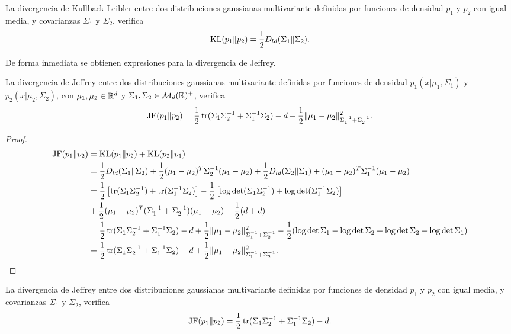 \begin{cor} \label{prop:caract_kl:2}
    La divergencia de Kullback-Leibler entre dos distribuciones gaussianas multivariante definidas por funciones de densidad $p_1$ y $p_2$ con igual media, y covarianzas $\Sigma_1$ y $\Sigma_2$, verifica
    \[  \operatorname{KL}(p_1\|p_2) = \frac{1}{2}D_{ld}(\Sigma_1\|\Sigma_2). \]
\end{cor}
De forma inmediata se obtienen expresiones para la divergencia de Jeffrey.
\begin{cor} \label{prop:caract_jeffrey:1}
    La divergencia de Jeffrey entre dos distribuciones gaussianas multivariante definidas por funciones de densidad $p_1(x|\mu_1,\Sigma_1)$ y $p_2(x|\mu_2,\Sigma_2)$, con $\mu_1,\mu_2 \in \mathbb{R}^d$ y $\Sigma_1,\Sigma_2 \in \mathcal{M}_d(\mathbb{R})^+$, verifica
    \[  \operatorname{JF}(p_1\|p_2) = \frac{1}{2}\operatorname{tr}(\Sigma_1\Sigma_2^{-1}+\Sigma_1^{-1}\Sigma_2) -d + \frac{1}{2}\|\mu_1-\mu_2\|_{\Sigma_1^{-1}+\Sigma_2^{-1}}^2. \]
\end{cor}
\begin{proof}
    \begin{equation*}
        \begin{split}
        \operatorname{JF}(p_1\|p_2) &= \operatorname{KL}(p_1\|p_2) + \operatorname{KL}(p_2\|p_1) \\
                    &= \frac{1}{2}D_{ld}(\Sigma_1\|\Sigma_2) + \frac{1}{2}(\mu_1-\mu_2)^T\Sigma_2^{-1}(\mu_1-\mu_2) + \frac{1}{2}D_{ld}(\Sigma_2\|\Sigma_1) + (\mu_1-\mu_2)^T\Sigma_1^{-1}(\mu_1-\mu_2) \\
                    &= \frac{1}{2}\left[\operatorname{tr}(\Sigma_1\Sigma_2^{-1})+\operatorname{tr}(\Sigma_1^{-1}\Sigma_2)\right] - \frac{1}{2}\left[\log\det(\Sigma_1\Sigma_2^{-1})+\log\det(\Sigma_1^{-1}\Sigma_2)\right]\\&+\frac{1}{2}(\mu_1-\mu_2)^T(\Sigma_1^{-1}+\Sigma_2^{-1})(\mu_1-\mu_2) - \frac{1}{2}(d+d) \\
                    &= \frac{1}{2} \operatorname{tr}(\Sigma_1\Sigma_2^{-1}+\Sigma_1^{-1}\Sigma_2) -d + \frac{1}{2}\|\mu_1-\mu_2\|_{\Sigma_1^{-1}+\Sigma_2^{-1}}^2 - \frac{1}{2}(\log\det\Sigma_1-\log\det\Sigma_2+\log\det\Sigma_2-\log\det\Sigma_1) \\
                    &= \frac{1}{2}\operatorname{tr}(\Sigma_1\Sigma_2^{-1}+\Sigma_1^{-1}\Sigma_2) -d + \frac{1}{2}\|\mu_1-\mu_2\|_{\Sigma_1^{-1}+\Sigma_2^{-1}}^2.
        \end{split}
    \end{equation*}
\end{proof}
\begin{cor} \label{prop:caract_jeffrey:2}
    La divergencia de Jeffrey entre dos distribuciones gaussianas multivariante definidas por funciones de densidad $p_1$ y $p_2$ con igual media, y covarianzas $\Sigma_1$ y $\Sigma_2$, verifica
    \[  \operatorname{JF}(p_1\|p_2) = \frac{1}{2}\operatorname{tr}(\Sigma_1\Sigma_2^{-1}+\Sigma_1^{-1}\Sigma_2) -d. \]
\end{cor}